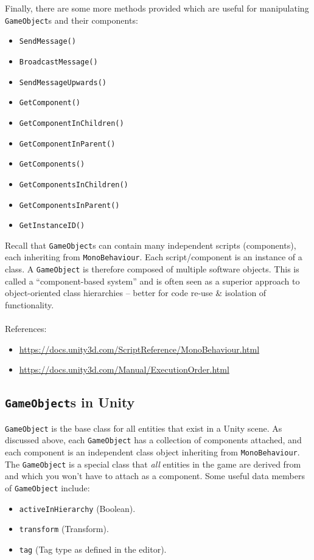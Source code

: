 \documentclass[a4paper,11pt]{article}
\begin{document}
Finally, there are some more methods provided which are useful for manipulating \verb|GameObject|s and their components: 
\begin{multicols}{3}
\begin{itemize}
    \item   \verb|SendMessage()|
    \item   \verb|BroadcastMessage()|
    \item   \verb|SendMessageUpwards()|
    \item   \verb|GetComponent()|
    \item   \verb|GetComponentInChildren()|
    \item   \verb|GetComponentInParent()|
    \item   \verb|GetComponents()|
    \item   \verb|GetComponentsInChildren()|
    \item   \verb|GetComponentsInParent()|
    \item   \verb|GetInstanceID()|
\end{itemize}
\end{multicols}

Recall that \verb|GameObject|s can contain many independent scripts (components), each inheriting from \verb|MonoBehaviour|. 
Each script/component is an instance of a class. 
A \verb|GameObject| is therefore composed of multiple software objects. 
This is called a ``component-based system'' and is often seen as a superior approach to object-oriented class hierarchies -- 
better for code re-use \& isolation of functionality. 
\\\\ 
References:
\begin{itemize}
    \item   \url{https://docs.unity3d.com/ScriptReference/MonoBehaviour.html}
    \item   \url{https://docs.unity3d.com/Manual/ExecutionOrder.html}
\end{itemize}

\subsection{\texttt{GameObject}s in Unity}
\verb|GameObject| is the base class for all entities that exist in a Unity scene. 
As discussed above, each \verb|GameObject| has a collection of components attached, and each component is an independent class 
object inheriting from \verb|MonoBehaviour|. 
The \verb|GameObject| is a special class that \emph{all} entities in the game are derived from and which you won't have to 
attach as a component. 
Some useful data members of \verb|GameObject| include:
\begin{itemize}
    \item   \verb|activeInHierarchy| (Boolean).
    \item   \verb|transform| (Transform). 
    \item   \verb|tag| (Tag type as defined in the editor).
\end{itemize}
\end{document}
